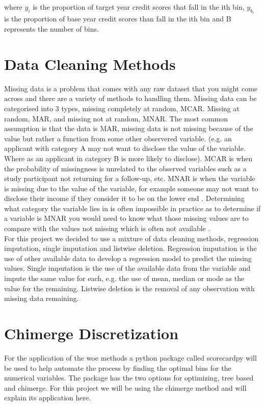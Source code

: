 where $y_i$ is the proportion of target year credit scores that fall in the ith bin, $y_{b_i}$ is the proportion of base year credit scores than fall in the ith bin and B represents the number of bins.

\section{Data Cleaning Methods} \label{sec:data_cleaning}

Missing data is a problem that comes with any raw dataset that you might come across and there are a variety of methods to handling them. Missing data can be categorised into 3 types, missing completely at random, MCAR. Missing at random, MAR, and missing not at random, MNAR. The most common assumption is that the data is MAR, missing data is not missing because of the value but rather a function from some other observered variable. (e.g. an applicant with category A may not want to disclose the value of the variable. Where as an applicant in category B is more likely to disclose). MCAR is when the probability of missingness is unrelated to the observed variables such as a study participant not returning for a follow-up, etc. MNAR is when the variable is missing due to the value of the variable, for example someone may not want to disclose their income if they consider it to be on the lower end \parencite{buhi2008out}. Determining what category the variable lies in is often impossible in practice as to determine if a variable is MNAR you would need to know what those missing values are to compare with the values not missing which is often not available \parencite{newman2014missing}.\\

For this project we decided to use a mixture of data cleaning methods, regression imputation, single imputation and listwise deletion. Regression imputation is the use of other available data to develop a regression model to predict the missing values. Single imputation is the use of the available data from the variable and impute the same value for each, e.g. the use of mean, median or mode as the value for the remaining. Listwise deletion is the removal of any observation with missing data remaining.

\section{Chimerge Discretization} \label{chimerge}

For the application of the woe methods a python package called scorecardpy will be used to help automate the process by finding the optimal bins for the numerical variables. The package has the two options for optimizing, tree based and chimerge. For this project we will be using the chimerge method and will explain its application here. \\

